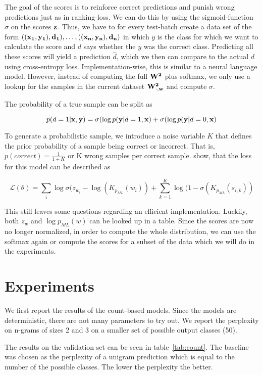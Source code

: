 \documentclass[11pt]{article}
\begin{document}
The goal of the scores is to reinforce correct predictions and punish wrong predictions just as in ranking-loss. We can do this by using the sigmoid-function $\sigma$ on the scores $\bf z$. Thus, we have to for every test-batch create a data set of the form $((\bf x_1, y_1), d_1), \ldots, ((\bf x_n, y_n), d_n)$ in which $y$ is the class for which we want to calculate the score and $d$ says whether the $y$ was the correct class. Predicting all these scores will yield a prediction $\hat d$, which we then can compare to the actual $d$ using cross-entropy loss.
Implementation-wise, this is similar to a neural language model. However, instead of computing the full $\bf W^2$ plus softmax, we only use a lookup for the samples in the current dataset $\bf W^2_{\cdot, w}$ and compute $\sigma$. 

The probability of a true sample can be split as 

$$p(d=1|\textbf {x}, \textbf y) = \sigma(\log p(\textbf y|d=1, \textbf x) + \sigma(\log p(\textbf y|d=0, \textbf x)$$

To generate a probabilistic sample, we introduce a noise variable $K$ that defines the prior probability of a sample being correct or incorrect. That is, $p(correct) = \frac{1}{1+K}$ or K wrong samples per correct sample.
\citet{mnih2012fast} show, that the loss for this model can be described as 

$$\mathcal{L}(\theta) = \sum_i \log \sigma(z_{w_i} - \log(K_{p_{ML}}(w_i)) + \sum_{k=1}^K \log(1-\sigma(K_{p_{ML}}(s_{i,k}))$$

This still leaves some questions regarding an efficient implementation. Luckily, both $z_w$ and $\log p_{ML}(w)$ can be looked up in a table. Since the scores are now no longer normalized, in order to compute the whole distribution, we can use the softmax again or compute the scores for a subset of the data which we will do in the experiments. 

\section{Experiments}

We first report the results of the count-based models. Since the models are deterministic, there are not many parameters to try out. We report the perplexity on n-grams of sizes 2 and 3 on a smaller set of possible output classes (50).

The results on the validation set can be seen in table~\ref{tab:count}. The baseline was chosen as the perplexity of a unigram prediction which is equal to the number of the possible classes. The lower the perplexity the better.
\end{document}
